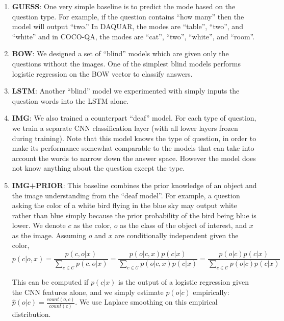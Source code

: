 \documentclass{article} %
\renewcommand{\#}[1]{\textbf{#1}}
\begin{document}
\begin{enumerate}[leftmargin=*]

\item \#{GUESS}: One very simple baseline is to predict the mode based on the
question type. For example, if the question contains ``how many'' then the
model will output ``two.'' In DAQUAR, the modes are ``table'', ``two'', and
``white'' and in COCO-QA, the modes are ``cat'', ``two'', ``white'', and
``room''.

\item \#{BOW}: We designed a set of ``blind'' models which are given only the
questions without the images. One of the simplest blind models performs
logistic regression on the BOW vector to classify answers.

\item \#{LSTM}: Another ``blind'' model we experimented with simply inputs the
question words into the LSTM alone.

\item \#{IMG}: We also trained a counterpart ``deaf'' model. For each type of
question, we train a separate CNN classification layer (with all lower layers
frozen during training). Note that this model knows the type of question, in
order to make its performance somewhat comparable to the models that can take
into account the words to narrow down the answer space. However the model does
not know anything about the question except the type.

\item \#{IMG+PRIOR}: This baseline combines the prior knowledge of an object
and the image understanding from the ``deaf model''. For example, a question
asking the color of a white bird flying in the blue sky may output white rather
than blue simply because the prior probability of the bird being blue is lower.
We denote $c$ as the color, $o$ as the class of the object of interest, and $x$
as the image. Assuming $o$ and $x$ are conditionally independent given the
color,
\begin{equation} 
p(c | o, x)
= \frac{p(c, o | x)}{\sum_{c \in \mathcal{C}} p(c, o | x)} 
= \frac{p(o | c, x) p(c | x)}{\sum_{c \in \mathcal{C}} p(o | c, x) p(c | x)}
= \frac{p(o | c) p(c | x)}{\sum_{c \in \mathcal{C}}p(o | c) p(c | x)}
\end{equation}

This can be computed if $p(c | x)$ is the output of a logistic regression given
the CNN features alone, and we simply estimate $p(o | c)$ empirically:
$\hat{p}(o | c) = \frac{count(o, c)}{count(c)}$. We use Laplace smoothing on
this empirical distribution.


\end{enumerate}
\end{document}
